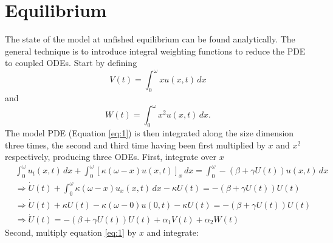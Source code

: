 \documentclass{article}
\begin{document}
\section{Equilibrium}
The state of the model at unfished equilibrium can be found analytically. The general technique is to introduce integral weighting functions to reduce the PDE to coupled ODEs. Start by defining
\begin{equation}
    V(t) = \int_0^{\omega} x u(x,t)\, dx
\end{equation}
and
\begin{equation}
    W(t) = \int_0^{\omega} x^2 u(x,t)\, dx .
\end{equation}
The model PDE (Equation \ref{eq:1}) is then integrated along the size dimension three times, the second and third time having been first multiplied by $x$ and $x^2$ respectively, producing three ODEs. First, integrate over $x$
\begin{subequations}
  \begin{align}
    &\int_0^{\omega} u_t(x,t)\,dx + \int_0^{\omega} [\kappa(\omega-x)u(x,t)]_x \, dx = \int_0^{\omega} -(\beta+\gamma U(t)) u(x,t)\, dx\\
    &\Rightarrow \dot{U}(t) + \int_0^{\omega} \kappa(\omega-x)u_x(x,t)\,dx - \kappa  U(t) = -(\beta+\gamma U(t)) U(t)\\%
    &\Rightarrow\dot{U}(t) + \kappa U(t) - \kappa(\omega-0)u(0,t) - \kappa  U(t) = -(\beta+\gamma U(t)) U(t)\\
    &\Rightarrow \dot{U}(t) = -(\beta+\gamma U(t)) U(t) + \alpha_1 V(t) + \alpha_2 W(t)
  \end{align}
\end{subequations}
Second, multiply equation \ref{eq:1} by $x$ and integrate:
\end{document}
